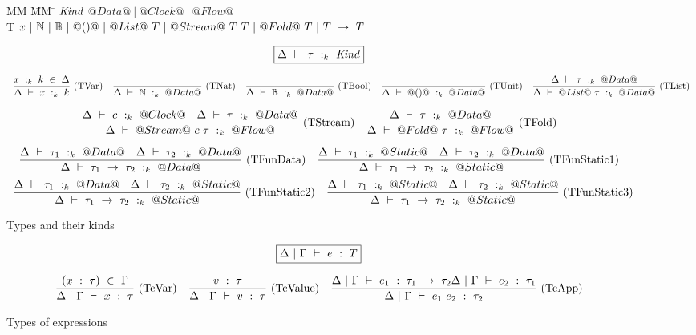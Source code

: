 
\begin{figure*}

\begin{tabbing}
MM \= MM \= \kill
$\mathit{Kind}$
\GrammarDef $@Data@~|~@Clock@~|~@Flow@$ \\

T
\GrammarDef $x~|~\mathbb{N}~|~\mathbb{B}~|~@()@
    ~|~ @List@~T
    ~|~ @Stream@~T~T
    ~|~ @Fold@~T
    ~|~ T~\to~T$ \\
\end{tabbing}

$$
\boxed{\Delta~\vdash~\tau~:_k~\mathit{Kind}}
$$

$$
\enskip \frac {\displaystyle 
    x~:_k~k~\in~\Delta
} {\displaystyle 
    \Delta~\vdash~x~:_k~k
} \  \mbox{(TVar)} \enskip
\enskip \frac {\displaystyle } {\displaystyle 
    \Delta~\vdash~\mathbb{N}~:_k~@Data@
} \  \mbox{(TNat)} \enskip
\enskip \frac {\displaystyle } {\displaystyle 
    \Delta~\vdash~\mathbb{B}~:_k~@Data@
} \  \mbox{(TBool)} \enskip
\enskip \frac {\displaystyle } {\displaystyle 
    \Delta~\vdash~@()@~:_k~@Data@
} \  \mbox{(TUnit)} \enskip
\enskip \frac {\displaystyle 
    \Delta~\vdash~\tau~:_k~@Data@
} {\displaystyle 
    \Delta~\vdash~@List@~\tau~:_k~@Data@
} \  \mbox{(TList)} \enskip
$$

$$
\enskip \frac {\displaystyle 
    \Delta~\vdash~c~:_k~@Clock@
    \quad
    \Delta~\vdash~\tau~:_k~@Data@
} {\displaystyle 
    \Delta~\vdash~@Stream@~c~\tau~:_k~@Flow@
} \  \mbox{(TStream)} \enskip
\enskip \frac {\displaystyle 
    \Delta~\vdash~\tau~:_k~@Data@
} {\displaystyle 
    \Delta~\vdash~@Fold@~\tau~:_k~@Flow@
} \  \mbox{(TFold)} \enskip
$$

$$
\enskip \frac {\displaystyle 
    \Delta~\vdash~\tau_1~:_k~@Data@
    \quad
    \Delta~\vdash~\tau_2~:_k~@Data@
} {\displaystyle 
    \Delta~\vdash~\tau_1~\to~\tau_2~:_k~@Data@
} \  \mbox{(TFunData)} \enskip
\enskip \frac {\displaystyle 
    \Delta~\vdash~\tau_1~:_k~@Static@
    \quad
    \Delta~\vdash~\tau_2~:_k~@Data@
} {\displaystyle 
    \Delta~\vdash~\tau_1~\to~\tau_2~:_k~@Static@
} \  \mbox{(TFunStatic1)} \enskip
$$
$$
\enskip \frac {\displaystyle 
    \Delta~\vdash~\tau_1~:_k~@Data@
    \quad
    \Delta~\vdash~\tau_2~:_k~@Static@
} {\displaystyle 
    \Delta~\vdash~\tau_1~\to~\tau_2~:_k~@Static@
} \  \mbox{(TFunStatic2)} \enskip
\enskip \frac {\displaystyle 
    \Delta~\vdash~\tau_1~:_k~@Static@
    \quad
    \Delta~\vdash~\tau_2~:_k~@Static@
} {\displaystyle 
    \Delta~\vdash~\tau_1~\to~\tau_2~:_k~@Static@
} \  \mbox{(TFunStatic3)} \enskip
$$



\caption{Types and their kinds}
\label{fig:source:type:kinds}
\end{figure*}


\begin{figure*}

$$
\boxed{\Delta~|~\Gamma ~\vdash~ e~:~T}
$$


$$
\enskip \frac {\displaystyle 
    (x~:~\tau)~\in~\Gamma
} {\displaystyle  
    \Delta~|~\Gamma ~\vdash~ x~:~\tau
} \  \mbox{(TcVar)} \enskip
\enskip \frac {\displaystyle 
    v~:~\tau
} {\displaystyle  
    \Delta~|~\Gamma ~\vdash~ v~:~\tau
} \  \mbox{(TcValue)} \enskip
\enskip \frac {\displaystyle 
    \Delta~|~\Gamma ~\vdash~ e_1~:~\tau_1~\to~\tau_2
    \Delta~|~\Gamma ~\vdash~ e_2~:~\tau_1
} {\displaystyle  
    \Delta~|~\Gamma ~\vdash~ e_1~e_2~:~\tau_2
} \  \mbox{(TcApp)} \enskip
$$

\caption{Types of expressions}
\label{fig:source:type:exp}
\end{figure*}

